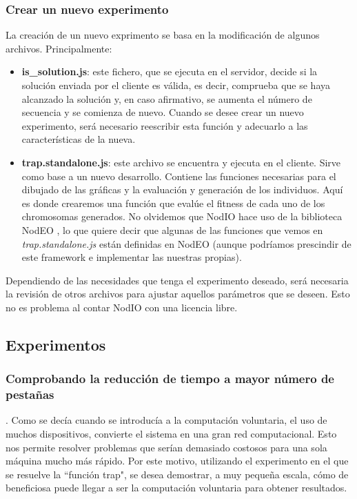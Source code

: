 \documentclass[runningheads,a4paper]{llncs}
\begin{document}
\subsubsection{Crear un nuevo experimento}
La creaci\'on de un nuevo exprimento se basa en la modificaci\'on de algunos archivos.
Principalmente:
\begin{itemize}
  \item \textbf{is\_solution.js}: este fichero, que se ejecuta en el servidor,
  decide si la soluci\'on enviada por el cliente es v\'alida, es decir,
  comprueba que se haya alcanzado la soluci\'on y, en caso afirmativo, se
  aumenta el n\'umero de secuencia y se comienza de nuevo. Cuando se desee
  crear un nuevo experimento, ser\'a necesario reescribir esta funci\'on y
  adecuarlo a las caracter\'isticas de la nueva.
  \item \textbf{trap.standalone.js}: este archivo se encuentra y ejecuta en el cliente.
  Sirve como base a un nuevo desarrollo. Contiene las funciones necesarias para
  el dibujado de las gr\'aficas y la evaluaci\'on y generaci\'on de los individuos.
  Aqu\'i es donde crearemos una funci\'on que eval\'ue el fitness de cada uno de
  los chromosomas generados. No olvidemos que NodIO hace uso de la biblioteca
  NodEO \cite{nodeo}, lo que quiere decir que algunas de las funciones que vemos en
  \textit{trap.standalone.js} est\'an definidas en NodEO (aunque podr\'iamos prescindir
  de este framework e implementar las nuestras propias).
\end{itemize}

Dependiendo de las necesidades que tenga el experimento deseado, ser\'a necesaria
la revisi\'on de otros archivos para ajustar aquellos par\'ametros que se deseen.
Esto no es problema al contar NodIO con una licencia libre.

\subsection{Experimentos}

\subsubsection{Comprobando la reducci\'on de tiempo a mayor n\'umero de pesta\~nas}.
Como se dec\'ia cuando se introduc\'ia a la computaci\'on voluntaria,
el uso de muchos dispositivos, convierte el sistema en una gran red computacional.
Esto nos permite resolver problemas que ser\'ian demasiado costosos para una sola
m\'aquina mucho m\'as r\'apido. Por este motivo, utilizando el experimento
en el que se resuelve la ``funci\'on trap", se desea
demostrar, a muy peque\~na escala, c\'omo de beneficiosa puede llegar a ser la computaci\'on
voluntaria para obtener resultados.
\end{document}

